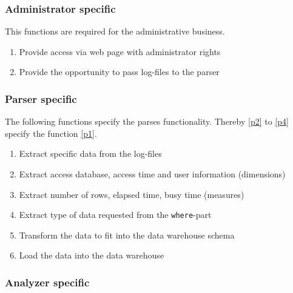 \subsubsection*{Administrator specific}
This functions are required for the administrative business.

\begin{enumerate}[resume]
  
  \item Provide access via web page with administrator rights\label{f15}
   
  \item Provide the opportunity to pass log-files to the parser\label{f16}
   
\end{enumerate}


\subsubsection*{Parser specific}
 
 The following functions specify the parses functionality.
 Thereby \ref{p2} to \ref{p4} specify the function \ref{p1}.
 
\begin{enumerate}[resume]
  
  \item Extract specific data from the log-files \label{p1}
  
  \item Extract access database, access time and user information (dimensions)\label{p2} %
  
  \item Extract number of rows, elapsed time, busy time (measures)\label{f17} %
  
  \item Extract type of data requested from the \texttt{where}-part\label{p4} %
  
  \item Transform the data to fit into the data warehouse schema\label{f18}
  
  \item Load the data into the data warehouse\label{f19}

\end{enumerate}

\subsubsection*{Analyzer specific}
 
